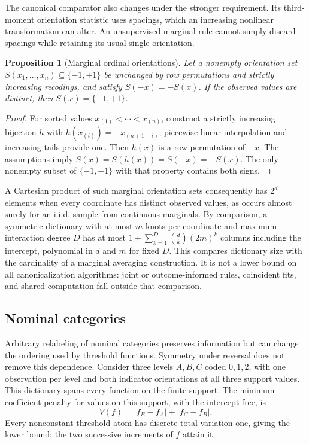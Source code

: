 \documentclass[11pt]{article}
\newtheorem{proposition}{Proposition}
\theoremstyle{definition}
\theoremstyle{remark}
\begin{document}
The canonical comparator also changes under the stronger requirement.
Its third-moment orientation statistic uses spacings, which an increasing
nonlinear transformation can alter. An unsupervised marginal rule cannot
simply discard spacings while retaining its usual single orientation.
\begin{proposition}[Marginal ordinal orientations]\label{prop:ordinal-frame}
Let a nonempty orientation set $S(x_1,\ldots,x_n)\subseteq\{-1,+1\}$
be unchanged by row permutations and strictly increasing recodings, and
satisfy $S(-x)=-S(x)$. If the observed values are distinct, then
$S(x)=\{-1,+1\}$.
\end{proposition}
\begin{proof}
For sorted values $x_{(1)}<\cdots<x_{(n)}$, construct a strictly increasing
bijection $h$ with $h(x_{(i)})=-x_{(n+1-i)}$; piecewise-linear interpolation
and increasing tails provide one. Then $h(x)$ is a row permutation of $-x$.
The assumptions imply $S(x)=S(h(x))=S(-x)=-S(x)$. The only nonempty
subset of $\{-1,+1\}$ with that property contains both signs.
\end{proof}

A Cartesian product of such marginal orientation sets consequently has
$2^d$ elements when every coordinate has distinct observed values, as occurs
almost surely for an i.i.d. sample from continuous marginals. By comparison,
a symmetric dictionary
with at most $m$ knots per coordinate and maximum interaction degree $D$
has at most $1+\sum_{k=1}^D\binom{d}{k}(2m)^k$ columns including the
intercept, polynomial in $d$ and $m$ for fixed $D$. This compares dictionary
size with the cardinality of a marginal averaging construction. It is not
a lower bound on all canonicalization algorithms: joint or outcome-informed
rules, coincident fits, and shared computation fall outside that comparison.

\subsection{Nominal categories}\label{sec:nominal}

Arbitrary relabeling of nominal categories preserves information but can
change the ordering used by threshold functions. Symmetry under reversal
does not remove this dependence. Consider three levels $A,B,C$ coded
$0,1,2$, with one observation per level and both indicator orientations
at all three support values. This dictionary spans every function on the
finite support. The minimum coefficient penalty for values on this support,
with the intercept free, is
\[
 V(f)=|f_B-f_A|+|f_C-f_B|.
\]
Every nonconstant threshold atom has discrete total variation one, giving
the lower bound; the two successive increments of $f$ attain it.
\end{document}
